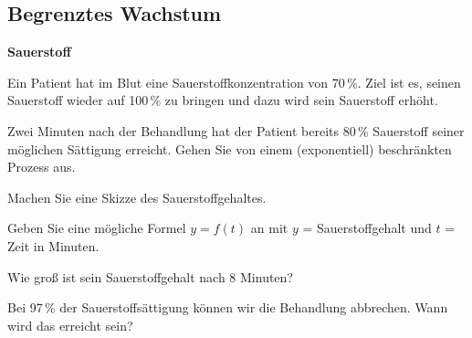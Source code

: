 
\subsection{Begrenztes Wachstum}


\bbwActAufgabenNr{} \textbf{Sauerstoff}

Ein Patient hat im Blut eine Sauerstoffkonzentration von 70\,\%. Ziel
ist es, seinen Sauerstoff wieder auf 100\,\% zu bringen und dazu wird
sein Sauerstoff erhöht.

Zwei Minuten nach der Behandlung hat der Patient bereits 80\,\%
Sauerstoff seiner möglichen Sättigung erreicht. Gehen Sie von einem
(exponentiell) beschränkten Prozess aus.

\begin{bbwAufgabenBlock}


\item Machen Sie eine Skizze des Sauerstoffgehaltes.

  
\item Geben Sie eine mögliche Formel $y = f(t)$ an mit $y$ = Sauerstoffgehalt und
$t$ = Zeit in Minuten.

  
\item Wie groß ist sein Sauerstoffgehalt nach 8 Minuten?

  
\item
  Bei 97\,\% der Sauerstoffsättigung können wir die Behandlung
abbrechen. Wann wird das erreicht sein?


\end{bbwAufgabenBlock}


\platzFuerBerechnungenBisEndeSeite{}


